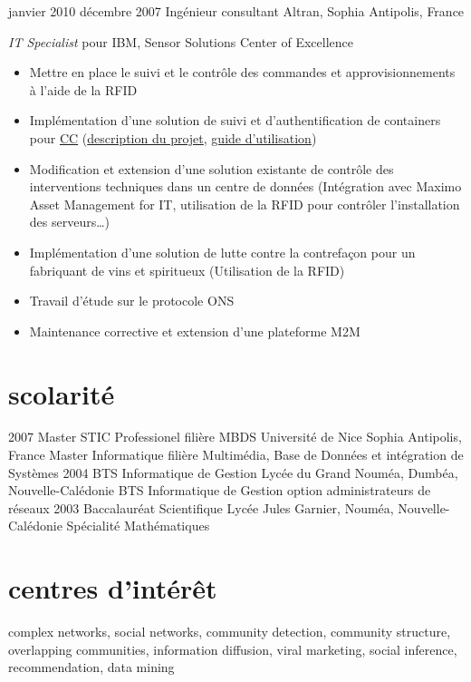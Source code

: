 \documentclass[]{roger-cv}
\begin{document}
\begin{entrylist}
  \entry
    {janvier 2010}
    {décembre 2007}
    {Ingénieur consultant}
    {Altran, Sophia Antipolis, France}  
    {
      \emph{IT Specialist} pour IBM, Sensor Solutions Center of Excellence\\
      \vspace{-3mm}
          \begin{itemize}
 	    \item Mettre en place le suivi et le contrôle des commandes et approvisionnements à l'aide de la RFID
 	    \item Implémentation d'une solution de suivi et d'authentification de containers pour \href{http://www.container-centralen.com/}{CC} (\href{http://www.container-centralen.co.uk/rfid/history.aspx}{description du projet}, \href{http://www.container-centralen.co.uk/rfid/user\%20guide\%20for\%20scanning.aspx}{guide d'utilisation})
               \item Modification et extension d'une solution existante de contrôle des interventions techniques dans un centre de données 
 	    (Intégration avec Maximo Asset Management for IT, utilisation de la RFID pour contrôler l'installation des serveurs\ldots)
 	    \item Implémentation d'une solution de lutte contre la contrefaçon pour un fabriquant de vins et spiritueux (Utilisation de la RFID)
 	    \item Travail d'étude sur le protocole ONS
 	    \item Maintenance corrective et extension d'une plateforme M2M
 	\end{itemize}
    }

\end{entrylist}

\section{scolarité}

\begin{entrylist}
  \entry
    {2007}
    {}
    {Master STIC Professionel {\normalfont filière MBDS}}
    {Université de Nice Sophia Antipolis, France}
    {Master Informatique filière Multimédia, Base de Données et intégration de Systèmes}
  \entry
    {2004}
    {}
    {BTS Informatique de Gestion}
    {Lycée du Grand Nouméa, Dumbéa, Nouvelle-Calédonie}
    {BTS Informatique de Gestion option administrateurs de réseaux}
  \entry
    {2003}
    {}
    {Baccalauréat Scientifique}
    {Lycée Jules Garnier, Nouméa, Nouvelle-Calédonie}
    {Spécialité Mathématiques}
\end{entrylist}

\section{centres d'intérêt}

complex networks, social networks, community detection, community structure,
overlapping communities, information diffusion, viral marketing, social
inference, recommendation, data mining
\end{document}
